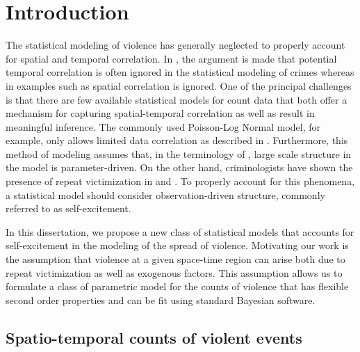 \documentclass[11pt]{isuthesis}
\begin{document}
\chapter{Introduction}
The statistical modeling of violence has generally neglected to properly account for spatial and temporal correlation.  In \cite{ratcliffe2010crime}, the argument is made that potential temporal correlation is often ignored in the statistical modeling of crimes whereas in examples such as \cite{mohler2013modeling} spatial correlation is ignored.  One of the principal challenges is that there are few available statistical models for count data that both offer a mechanism for capturing spatial-temporal correlation as well as result in meaningful inference.  The commonly used Poisson-Log Normal model, for example, only allows limited data correlation as described in \cite{aitchison1989multivariate}.  Furthermore, this method of modeling assumes that, in the terminology of \cite{cox1981statistical}, large scale structure in the model is parameter-driven.  On the other hand, criminologists have shown the presence of repeat victimization in \cite{johnson1997new} and \cite{johnson2007space}.  To properly account for this phenomena, a statistical model should consider observation-driven structure, commonly referred to as self-excitement.

In this dissertation, we propose a new class of statistical models that accounts for self-excitement in the modeling of the spread of violence.  Motivating our work is the assumption that violence at a given space-time region can arise both due to repeat victimization as well as  exogenous factors.  This assumption allows us to formulate a class of parametric model for the counts of violence that has flexible second order properties and can be fit using standard Bayesian software.

\section{Spatio-temporal counts of violent events}
\end{document}
